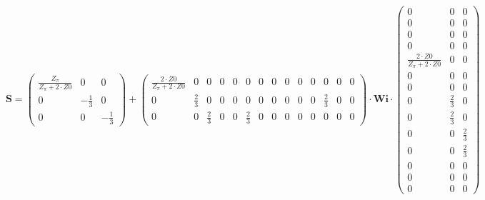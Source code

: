 \[ \mathbf{S} = \left(\begin{smallmatrix}
\frac{Z_{\pi}}{Z_{\pi}+2\cdot Z0} & 0 & 0 \\ 0 & -\frac{1}{3} & 0 \\ 0
& 0 & -\frac{1}{3} \end{smallmatrix}\right) +
\left(\begin{smallmatrix} \frac{2\cdot Z0}{Z_{\pi}+2\cdot Z0} & 0 & 0
& 0 & 0 & 0 & 0 & 0 & 0 & 0 & 0 & 0 & 0 & 0 \\ 0 & \frac{2}{3} & 0 & 0
& 0 & 0 & 0 & 0 & 0 & 0 & 0 & \frac{2}{3} & 0 & 0 \\ 0 & 0 &
\frac{2}{3} & 0 & 0 & \frac{2}{3} & 0 & 0 & 0 & 0 & 0 & 0 & 0 & 0
\end{smallmatrix}\right) \cdot \mathbf{Wi}
\cdot\left(\begin{smallmatrix} 0 & 0 & 0 \\ 0 & 0 & 0 \\ 0 & 0 & 0 \\
0 & 0 & 0 \\ \frac{2\cdot Z0}{Z_{\pi}+2\cdot Z0} & 0 & 0 \\ 0 & 0 & 0
\\ 0 & 0 & 0 \\ 0 & \frac{2}{3} & 0 \\ 0 & \frac{2}{3} & 0 \\ 0 & 0 &
\frac{2}{3} \\ 0 & 0 & \frac{2}{3} \\ 0 & 0 & 0 \\ 0 & 0 & 0 \\ 0 & 0
& 0 \end{smallmatrix}\right) \]
